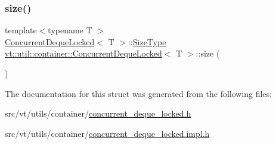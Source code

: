 \subsubsection{\texorpdfstring{size()}{size()}}
{\footnotesize\ttfamily template$<$typename T $>$ \\
\hyperlink{structvt_1_1util_1_1container_1_1_concurrent_deque_locked}{Concurrent\+Deque\+Locked}$<$ T $>$\+::\hyperlink{structvt_1_1util_1_1container_1_1_concurrent_deque_locked_a6f35f4923f1329d25378656b0582e916}{Size\+Type} \hyperlink{structvt_1_1util_1_1container_1_1_concurrent_deque_locked}{vt\+::util\+::container\+::\+Concurrent\+Deque\+Locked}$<$ T $>$\+::size (\begin{DoxyParamCaption}{ }\end{DoxyParamCaption})}



The documentation for this struct was generated from the following files\+:\begin{DoxyCompactItemize}
\item 
src/vt/utils/container/\hyperlink{concurrent__deque__locked_8h}{concurrent\+\_\+deque\+\_\+locked.\+h}\item 
src/vt/utils/container/\hyperlink{concurrent__deque__locked_8impl_8h}{concurrent\+\_\+deque\+\_\+locked.\+impl.\+h}\end{DoxyCompactItemize}
